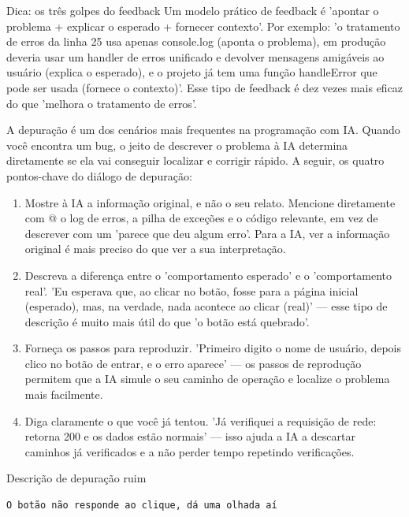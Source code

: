 \begin{tcbinfo}{Dica: os três golpes do feedback}
Um modelo prático de feedback é 'apontar o problema + explicar o esperado + fornecer contexto'. Por exemplo: 'o tratamento de erros da linha 25 usa apenas console.log (aponta o problema), em produção deveria usar um handler de erros unificado e devolver mensagens amigáveis ao usuário (explica o esperado), e o projeto já tem uma função handleError que pode ser usada (fornece o contexto)'. Esse tipo de feedback é dez vezes mais eficaz do que 'melhora o tratamento de erros'.

\end{tcbinfo}


A depuração é um dos cenários mais frequentes na programação com IA. Quando você encontra um bug, o jeito de descrever o problema à IA determina diretamente se ela vai conseguir localizar e corrigir rápido. A seguir, os quatro pontos-chave do diálogo de depuração:

\begin{enumerate}
  \item Mostre à IA a informação original, e não o seu relato. Mencione diretamente com @ o log de erros, a pilha de exceções e o código relevante, em vez de descrever com um 'parece que deu algum erro'. Para a IA, ver a informação original é mais preciso do que ver a sua interpretação.
  \item Descreva a diferença entre o 'comportamento esperado' e o 'comportamento real'. 'Eu esperava que, ao clicar no botão, fosse para a página inicial (esperado), mas, na verdade, nada acontece ao clicar (real)' — esse tipo de descrição é muito mais útil do que 'o botão está quebrado'.
  \item Forneça os passos para reproduzir. 'Primeiro digito o nome de usuário, depois clico no botão de entrar, e o erro aparece' — os passos de reprodução permitem que a IA simule o seu caminho de operação e localize o problema mais facilmente.
  \item Diga claramente o que você já tentou. 'Já verifiquei a requisição de rede: retorna 200 e os dados estão normais' — isso ajuda a IA a descartar caminhos já verificados e a não perder tempo repetindo verificações.
\end{enumerate}

Descrição de depuração ruim

\begin{lstlisting}
O botão não responde ao clique, dá uma olhada aí
\end{lstlisting}

